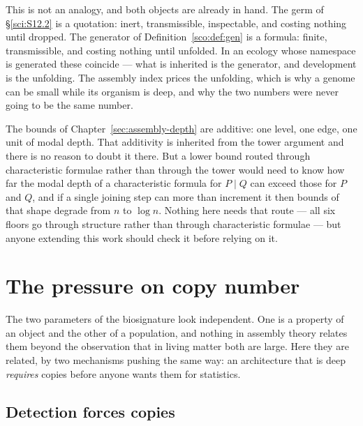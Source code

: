 \begin{remark}
\label{scm:rmk:germgen}
This is not an analogy, and both objects are already in hand. The germ of
\S\ref{sci:S12.2} is a quotation: inert, transmissible, inspectable, and
costing nothing until dropped. The generator of
Definition~\ref{sco:def:gen} is a formula: finite, transmissible, and
costing nothing until unfolded. In an ecology whose namespace is
generated these coincide --- what is inherited is the generator, and
development is the unfolding. The assembly index prices the unfolding,
which is why a genome can be small while its organism is deep, and why the
two numbers were never going to be the same number.
\end{remark}

\begin{remark}
\label{scm:rmk:direction}
The bounds of Chapter~\ref{sec:assembly-depth} are additive: one level,
one edge, one unit of modal depth. That additivity is inherited from the
tower argument and there is no reason to doubt it there. But a lower bound
routed through characteristic formulae rather than through the tower would
need to know how far the modal depth of a characteristic formula for
$P \mid Q$ can exceed those for $P$ and $Q$, and if a single joining step
can more than increment it then bounds of that shape degrade from $n$ to
$\log n$. Nothing here needs that route --- all six floors go through
structure rather than through characteristic formulae --- but anyone
extending this work should check it before relying on it.
\end{remark}

\section{The pressure on copy number}
\label{scm:sec:pressure}

The two parameters of the biosignature look independent. One is a property
of an object and the other of a population, and nothing in assembly theory
relates them beyond the observation that in living matter both are large.
Here they are related, by two mechanisms pushing the same way: an
architecture that is deep \emph{requires} copies before anyone wants them
for statistics.

\subsection{Detection forces copies}


